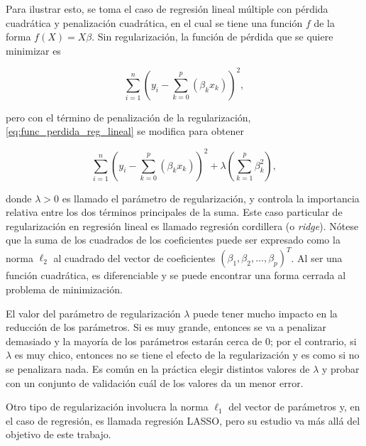 Para ilustrar esto, se toma el caso de regresión lineal múltiple con pérdida cuadrática y penalización cuadrática, en el cual se tiene una función $f$ de la forma $f(X) = X \beta$. Sin regularización, la función de pérdida que se quiere minimizar es

\begin{equation}
  \label{eq:func_perdida_reg_lineal}
  \sum_{i = 1}^n{ \left( y_i - \sum_{k = 0}^p \left( \beta_k x_k \right) \right) ^ 2},
\end{equation}

pero con el término de penalización de la regularización, \ref{eq:func_perdida_reg_lineal} se modifica para obtener

\begin{equation}
  \label{eq:func_perdida_reg_lineal_reg}
  \sum_{i = 1}^n{ \left( y_i - \sum_{k = 0}^p \left( \beta_k x_k \right) \right) ^ 2} 
  + \lambda \left( \sum_{k = 1}^p \beta_k^2 \right),
\end{equation}

donde $\lambda > 0$ es llamado el parámetro de regularización, y controla la importancia relativa entre los dos términos principales de la suma. Este caso particular de regularización en regresión lineal es llamado regresión cordillera (o \textit{ridge}). Nótese que la suma de los cuadrados de los coeficientes puede ser expresado como la norma $\ell_2$ al cuadrado del vector de coeficientes $\left( \beta_1, \beta_2, \hdots, \beta_p \right)^T$. Al ser una función cuadrática, es diferenciable y se puede encontrar una forma cerrada al problema de minimización.

El valor del parámetro de regularización $\lambda$ puede tener mucho impacto en la reducción de los parámetros. Si es muy grande, entonces se va a penalizar demasiado y la mayoría de los parámetros estarán cerca de 0; por el contrario, si $\lambda$ es muy chico, entonces no se tiene el efecto de la regularización y es como si no se penalizara nada. Es común en la práctica elegir distintos valores de $\lambda$ y probar con un conjunto de validación cuál de los valores da un menor error.

Otro tipo de regularización involucra la norma $\ell_1$ del vector de parámetros y, en el caso de regresión, es llamada regresión LASSO, pero su estudio va más allá del objetivo de este trabajo.







